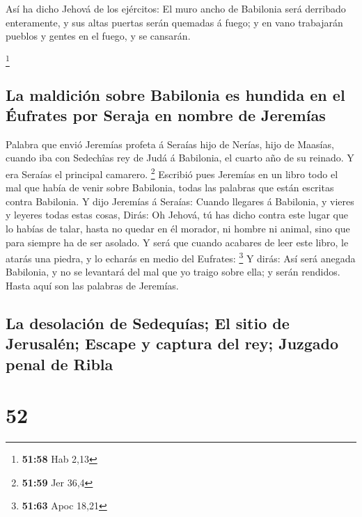  Así ha dicho Jehová de los ejércitos: El muro ancho de
Babilonia será derribado enteramente, y sus altas puertas serán quemadas
á fuego; y en vano trabajarán pueblos y gentes en el fuego, y se
cansarán.

\footnote{\textbf{51:58} Hab 2,13}

\hypertarget{la-maldiciuxf3n-sobre-babilonia-es-hundida-en-el-uxe9ufrates-por-seraja-en-nombre-de-jeremuxedas}{%
\subsection{La maldición sobre Babilonia es hundida en el Éufrates por
Seraja en nombre de
Jeremías}\label{la-maldiciuxf3n-sobre-babilonia-es-hundida-en-el-uxe9ufrates-por-seraja-en-nombre-de-jeremuxedas}}

 Palabra que envió Jeremías profeta á Seraías hijo de
Nerías, hijo de Maasías, cuando iba con Sedechîas rey de Judá á
Babilonia, el cuarto año de su reinado. Y era Seraías el principal
camarero. \footnote{\textbf{51:59} Jer 36,4}  Escribió
pues Jeremías en un libro todo el mal que había de venir sobre
Babilonia, todas las palabras que están escritas contra Babilonia.
 Y dijo Jeremías á Seraías: Cuando llegares á Babilonia,
y vieres y leyeres todas estas cosas,  Dirás: Oh Jehová,
tú has dicho contra este lugar que lo habías de talar, hasta no quedar
en él morador, ni hombre ni animal, sino que para siempre ha de ser
asolado.  Y será que cuando acabares de leer este libro,
le atarás una piedra, y lo echarás en medio del Eufrates: \footnote{\textbf{51:63}
  Apoc 18,21}  Y dirás: Así será anegada Babilonia, y no
se levantará del mal que yo traigo sobre ella; y serán rendidos. Hasta
aquí son las palabras de Jeremías.

\hypertarget{la-desolaciuxf3n-de-sedequuxedas-el-sitio-de-jerusaluxe9n-escape-y-captura-del-rey-juzgado-penal-de-ribla}{%
\subsection{La desolación de Sedequías; El sitio de Jerusalén; Escape y
captura del rey; Juzgado penal de
Ribla}\label{la-desolaciuxf3n-de-sedequuxedas-el-sitio-de-jerusaluxe9n-escape-y-captura-del-rey-juzgado-penal-de-ribla}}

\hypertarget{section-51}{%
\section{52}\label{section-51}}

